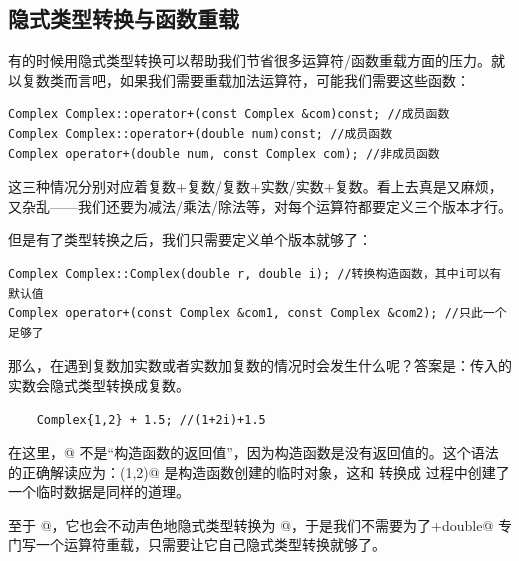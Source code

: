 \subsection*{隐式类型转换与函数重载}
有的时候用隐式类型转换可以帮助我们节省很多运算符/函数重载方面的压力。就以复数类而言吧，如果我们需要重载加法运算符，可能我们需要这些函数：
\begin{lstlisting}
Complex Complex::operator+(const Complex &com)const; //成员函数
Complex Complex::operator+(double num)const; //成员函数
Complex operator+(double num, const Complex com); //非成员函数
\end{lstlisting}
这三种情况分别对应着复数+复数/复数+实数/实数+复数。看上去真是又麻烦，又杂乱——我们还要为减法/乘法/除法等，对每个运算符都要定义三个版本才行。\par
但是有了类型转换之后，我们只需要定义单个版本就够了：
\begin{lstlisting}
Complex Complex::Complex(double r, double i); //转换构造函数，其中i可以有默认值
Complex operator+(const Complex &com1, const Complex &com2); //只此一个足够了
\end{lstlisting}
那么，在遇到复数加实数或者实数加复数的情况时会发生什么呢？答案是：传入的实数会隐式类型转换成复数。
\begin{lstlisting}
    Complex{1,2} + 1.5; //(1+2i)+1.5
\end{lstlisting}
在这里，@ 不是``构造函数的返回值''，因为构造函数是没有返回值的。这个语法的正确解读应为：\lstinline@Complex(1,2)@ 是构造函数创建的临时对象，这和 \lstinline@int@ 转换成 \lstinline@double@ 过程中创建了一个临时数据是同样的道理。\par
至于 @，它也会不动声色地隐式类型转换为 @，于是我们不需要为了\newline\lstinline@Complex+double@ 专门写一个运算符重载，只需要让它自己隐式类型转换就够了。\par
